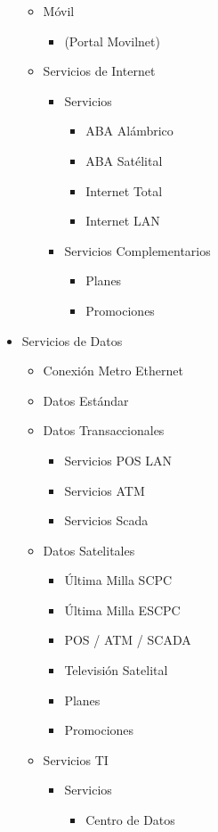 \documentclass[11pt, letterpaper, oneside, spanish]{scrbook}
\begin{document}
\begin{itemize}
\begin{itemize}
\begin{itemize}
\end{itemize}
\item Móvil
\begin{itemize}
\item (Portal Movilnet)
\end{itemize}
\item Servicios de Internet
\begin{itemize}
\item Servicios
\begin{itemize}
\item ABA Alámbrico
\item ABA Satélital
\item Internet Total
\item Internet LAN
\end{itemize}
\item Servicios Complementarios
\begin{itemize}
\item Planes
\item Promociones
\end{itemize}
\end{itemize}
\end{itemize}
\item Servicios de Datos
\begin{itemize}
\item Conexión Metro Ethernet
\item Datos Estándar
\item Datos Transaccionales
\begin{itemize}
\item Servicios POS LAN
\item Servicios ATM
\item Servicios Scada
\end{itemize}
\item Datos Satelitales
\begin{itemize}
\item Última Milla SCPC
\item Última Milla ESCPC
\item POS / ATM / SCADA
\item Televisión Satelital
\item Planes
\item Promociones
\end{itemize}
\item Servicios TI
\begin{itemize}
\item Servicios
\begin{itemize}
\item Centro de Datos

\end{itemize}
\end{itemize}
\end{itemize}
\end{itemize}
\end{document}
